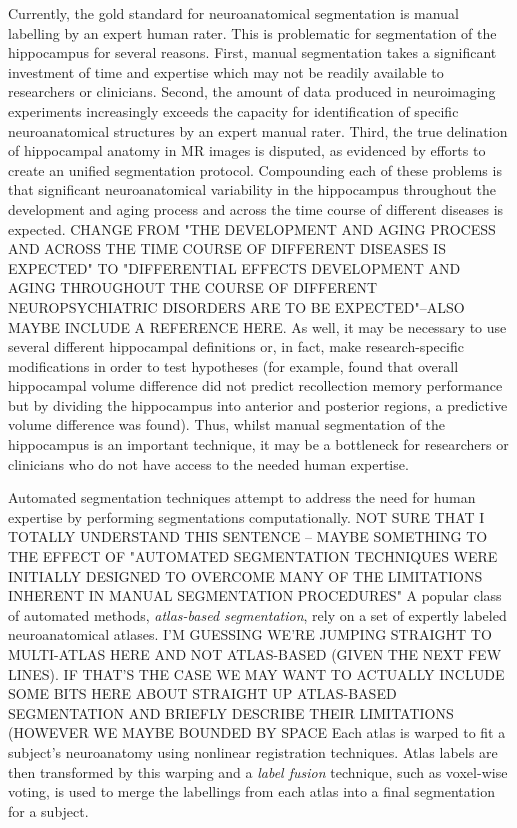 \documentclass{article}
\begin{document}
Currently, the gold standard for neuroanatomical segmentation is manual
labelling by an expert human rater.  This is problematic for segmentation of
the hippocampus for several reasons.  First, manual segmentation takes a
significant investment of time and expertise \cite{Hammers2003} which may not
be readily available to researchers or clinicians.  Second, the amount of data
produced in neuroimaging experiments increasingly exceeds the capacity for
identification of specific neuroanatomical structures by an expert manual
rater.  Third, the true delination of hippocampal anatomy in MR images is
disputed\cite{Geuze2004}, as evidenced by efforts to create an unified
segmentation protocol\cite{Jack2011}.  Compounding each of these problems is
that significant neuroanatomical variability in the hippocampus throughout the
development and aging process and across the time course of different diseases
is expected.  {CHANGE FROM "THE DEVELOPMENT AND AGING PROCESS AND ACROSS THE TIME COURSE OF DIFFERENT DISEASES IS EXPECTED" TO "DIFFERENTIAL EFFECTS  DEVELOPMENT AND AGING THROUGHOUT THE COURSE OF DIFFERENT NEUROPSYCHIATRIC DISORDERS ARE TO BE EXPECTED"--ALSO MAYBE INCLUDE A REFERENCE HERE}.  As well, it may be necessary to use several different hippocampal
definitions or, in fact, make research-specific modifications in order to test
hypotheses (for example, \cite{Poppenk2011} found that overall hippocampal
volume difference did not predict recollection memory performance but by
dividing the hippocampus into anterior and posterior regions, a predictive
volume difference was found).  Thus, whilst manual segmentation of the
hippocampus is an important technique, it may be a bottleneck for researchers
or clinicians who do not have access to the needed human expertise.

Automated segmentation techniques attempt to address the need for human
expertise by performing segmentations computationally.  {NOT SURE THAT I TOTALLY UNDERSTAND THIS SENTENCE  -- MAYBE SOMETHING TO THE EFFECT OF "AUTOMATED SEGMENTATION TECHNIQUES WERE INITIALLY DESIGNED TO OVERCOME MANY OF THE LIMITATIONS INHERENT IN MANUAL SEGMENTATION PROCEDURES"} A popular class of
automated methods, {\it atlas-based segmentation}, rely on a set of expertly
labeled neuroanatomical atlases.  {I'M GUESSING WE'RE JUMPING STRAIGHT TO MULTI-ATLAS HERE AND NOT ATLAS-BASED (GIVEN THE NEXT FEW LINES).  IF THAT'S THE CASE WE MAY WANT TO ACTUALLY INCLUDE SOME BITS HERE ABOUT STRAIGHT UP ATLAS-BASED SEGMENTATION AND BRIEFLY DESCRIBE THEIR LIMITATIONS (HOWEVER WE MAYBE BOUNDED BY SPACE}  Each atlas is warped to fit a subject's
neuroanatomy using nonlinear registration
techniques\cite{Collins1995,Klein2009}.  Atlas labels are then transformed by
this warping and a {\it label fusion} technique, such as voxel-wise voting, is
used to merge the labellings from each atlas into a final segmentation for a
subject.  
\end{document}
